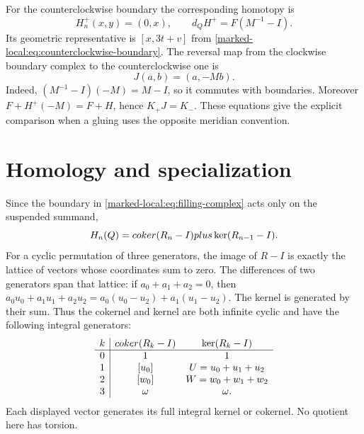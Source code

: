 For the counterclockwise boundary the corresponding homotopy is
\begin{equation}\label{marked-local:eq:positive-H}
 H_n^+(x,y)=(0,x),\qquad d_QH^+=F(M^{-1}-I).
\end{equation}
Its geometric representative is $[x,3t+v]$ from
\eqref{marked-local:eq:counterclockwise-boundary}.
The reversal map from the clockwise boundary complex to the
counterclockwise one is
\[
 J(a,b)=(a,-Mb).
\]
Indeed, $(M^{-1}-I)(-M)=M-I$, so it commutes with boundaries.
Moreover $F+H^+(-M)=F+H$, hence $K_+J=K_-$.
These equations give the explicit comparison when a gluing uses the
opposite meridian convention.

\section{Homology and specialization}

Since the boundary in
\eqref{marked-local:eq:filling-complex} acts only on the suspended summand,
\begin{equation}\label{marked-local:eq:Q-homology}
 H_n(Q)=coker(R_n-I)plus\ker(R_{n-1}-I).
\end{equation}
For a cyclic permutation of three generators, the image of $R-I$
is exactly the lattice of vectors whose coordinates sum to zero.
The differences of two generators span that lattice: if
$a_0+a_1+a_2=0$, then
$a_0u_0+a_1u_1+a_2u_2=a_0(u_0-u_2)+a_1(u_1-u_2)$.
The kernel is generated by their sum. Thus the cokernel and kernel
are both infinite cyclic and have the following integral generators:
\[
 \begin{array}{c|cc}
 k&coker(R_k-I)&\ker(R_k-I)\\ \hline
 0&1&1\\
 1&[u_0]&U=u_0+u_1+u_2\\
 2&[w_0]&W=w_0+w_1+w_2\\
 3&\omega&\omega.
 \end{array}
\]
Each displayed vector generates its full integral kernel or cokernel.
No quotient here has torsion.


